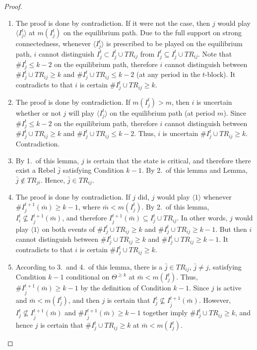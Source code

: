 \documentclass[12pt,letter]{article}
\theoremstyle{definition}
\theoremstyle{definition}
\theoremstyle{remark}
\theoremstyle{claim}
\begin{document}
\begin{proof}
\begin{enumerate}
\item The proof is done by contradiction. If it were not the case, then $j$ would play $\langle I^t_j \rangle$ at $m(I^t_j)$ on the equilibrium path. Due to the full support on strong connectedness, whenever $\langle I^t_j \rangle$ is prescribed to be played on the equilibrium path, $i$ cannot distinguish $I^t_j\subset I^t_j\cup TR_{ij}$ from $I^t_j\subseteq I^t_j\cup TR_{ij}$. Note that $\#I^t_j\leq k-2$ on the equilibrium path, therefore $i$ cannot distinguish between $\#I^t_j\cup TR_{ij}\geq k$ and $\#I^t_j\cup TR_{ij}\leq k-2$ (at any period in the $t$-block). It contradicts to that $i$ is certain $\#I^{t}_j\cup TR_{ij}\geq k$.
\item The proof is done by contradiction. If $m(I^t_j)> m$, then $i$ is uncertain whether or not $j$ will play $\langle I^t_j \rangle$ on the equilibrium path (at period $m$). Since $\#I^t_j\leq k-2$ on the equilibrium path, therefore $i$ cannot distinguish between $\#I^t_j\cup TR_{ij}\geq k$ and $\#I^t_j\cup TR_{ij}\leq k-2$. Thus, $i$ is uncertain $\#I^{t}_j\cup TR_{ij}\geq k$. Contradiction.
\item By 1.~of this lemma, $j$ is certain that the state is critical, and therefore there exist a Rebel $\bar{j}$ satisfying Condition $k-1$. By 2.~of this lemma and Lemma, $\bar{j}\not\in TR_{ji}$. Hence, $\bar{j}\in TR_{ij}$.
\item The proof is done by contradiction. If $j$ did, $j$ would play $\langle 1 \rangle$ whenever $\#I^{t+1}_j(\bar{m})\geq k-1$, where $\bar{m}<m(I^t_j)$. By 2.~of this lemma, $I^t_i\not\subseteq I^{t+1}_j(\bar{m})$, and therefore $I^{t+1}_j(\bar{m})\subseteq I^{t}_j\cup TR_{ij}$. In other words, $j$ would play $\langle 1 \rangle$ on both events of $\#I^{t}_j\cup TR_{ij}\geq k$ and $\#I^{t}_j\cup TR_{ij}\geq k-1$. But then $i$ cannot distinguish between $\#I^t_j\cup TR_{ij}\geq k$ and $\#I^t_j\cup TR_{ij}\geq k-1$. It contradicts to that $i$ is certain $\#I^{t}_j\cup TR_{ij}\geq k$.
\item According to 3.~and 4.~of this lemma, there is a $\bar{j}\in TR_{ij}$, $\bar{j}\neq j$, satisfying Condition $k-1$ conditional on $\Theta^{\geq k}$ at $\bar{m}<m(I^t_j)$. Thus, $\#I^{t+1}_{\bar{j}}(\bar{m})\geq k-1$ by the definition of Condition $k-1$. Since $j$ is active and $\bar{m}<m(I^t_j)$, and then $j$ is certain that $I^t_j\not\subseteq I^{t+1}_{\bar{j}}(\bar{m})$. However, $I^t_j\not\subseteq I^{t+1}_{\bar{j}}(\bar{m})$ and $\#I^{t+1}_{\bar{j}}(\bar{m})\geq k-1$ together imply $\#I^t_j\cup TR_{ij}\geq k$, and hence $j$ is certain that $\#I^t_j\cup TR_{ij}\geq k$ at $\bar{m}<m(I^t_j)$.

\end{enumerate}  
\end{proof}
\end{document}
